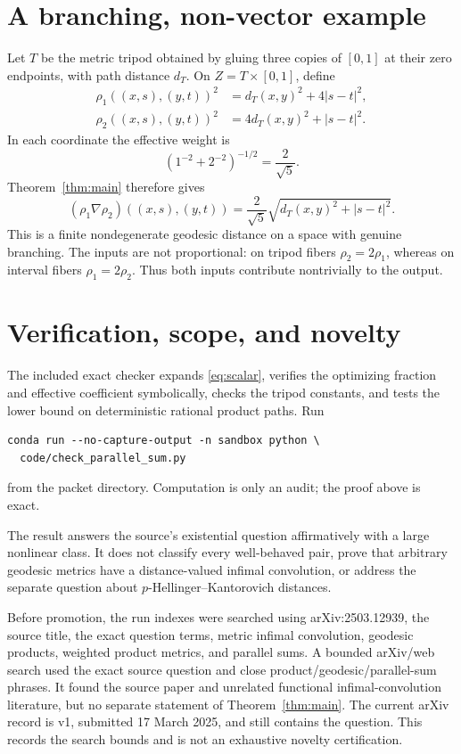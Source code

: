 \documentclass[11pt]{article}
\begin{document}
\section{A branching, non-vector example}

Let \(T\) be the metric tripod obtained by gluing three copies of \([0,1]\)
at their zero endpoints, with path distance \(d_T\).  On
\(Z=T\times[0,1]\), define
\begin{align*}
\rho_1((x,s),(y,t))^2&=d_T(x,y)^2+4|s-t|^2,\\
\rho_2((x,s),(y,t))^2&=4d_T(x,y)^2+|s-t|^2.
\end{align*}
In each coordinate the effective weight is
\[
\left(1^{-2}+2^{-2}\right)^{-1/2}=\frac2{\sqrt5}.
\]
Theorem~\ref{thm:main} therefore gives
\begin{equation}\label{eq:tripod}
(\rho_1\nabla\rho_2)((x,s),(y,t))
=\frac2{\sqrt5}\sqrt{d_T(x,y)^2+|s-t|^2}.
\end{equation}
This is a finite nondegenerate geodesic distance on a space with genuine
branching.  The inputs are not proportional: on tripod fibers \(\rho_2=2\rho_1\),
whereas on interval fibers \(\rho_1=2\rho_2\).  Thus both inputs contribute
nontrivially to the output.

\section{Verification, scope, and novelty}

The included exact checker expands \eqref{eq:scalar}, verifies the optimizing
fraction and effective coefficient symbolically, checks the tripod constants,
and tests the lower bound on deterministic rational product paths.  Run
\begin{verbatim}
conda run --no-capture-output -n sandbox python \
  code/check_parallel_sum.py
\end{verbatim}
from the packet directory.  Computation is only an audit; the proof above is
exact.

The result answers the source's existential question affirmatively with a
large nonlinear class.  It does not classify every well-behaved pair, prove
that arbitrary geodesic metrics have a distance-valued infimal convolution,
or address the separate question about \(p\)-Hellinger--Kantorovich distances.

Before promotion, the run indexes were searched using arXiv:2503.12939, the
source title, the exact question terms, metric infimal convolution, geodesic
products, weighted product metrics, and parallel sums.  A bounded arXiv/web
search used the exact source question and close product/geodesic/parallel-sum
phrases.  It found the source paper and unrelated functional
infimal-convolution literature, but no separate statement of
Theorem~\ref{thm:main}.  The current arXiv record is v1, submitted 17 March
2025, and still contains the question.  This records the search bounds and is
not an exhaustive novelty certification.
\end{document}
